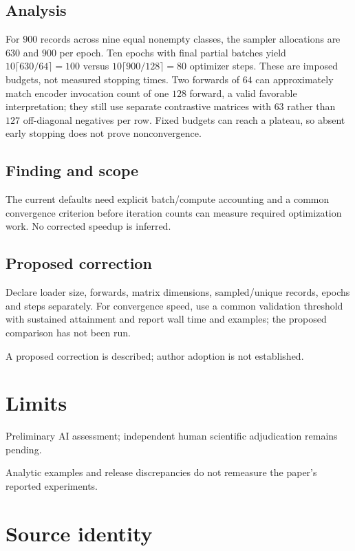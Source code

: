 \documentclass[11pt]{article}
\begin{document}
\subsection*{Analysis}

For \(900\) records across nine equal nonempty classes, the sampler allocations are \(630\) and \(900\) per epoch. Ten epochs with final partial batches yield \(10\lceil630/64\rceil=100\) versus \(10\lceil900/128\rceil=80\) optimizer steps. These are imposed budgets, not measured stopping times. Two forwards of \(64\) can approximately match encoder invocation count of one \(128\) forward, a valid favorable interpretation; they still use separate contrastive matrices with \(63\) rather than \(127\) off-diagonal negatives per row. Fixed budgets can reach a plateau, so absent early stopping does not prove nonconvergence.

\subsection*{Finding and scope}

The current defaults need explicit batch/compute accounting and a common convergence criterion before iteration counts can measure required optimization work. No corrected speedup is inferred.

\subsection*{Proposed correction}

Declare loader size, forwards, matrix dimensions, sampled/unique records, epochs and steps separately. For convergence speed, use a common validation threshold with sustained attainment and report wall time and examples; the proposed comparison has not been run.

A proposed correction is described; author adoption is not established.

\section*{Limits}

Preliminary AI assessment; independent human scientific adjudication remains pending.\par

Analytic examples and release discrepancies do not remeasure the paper’s reported experiments.\par

\section*{Source identity}
\end{document}
